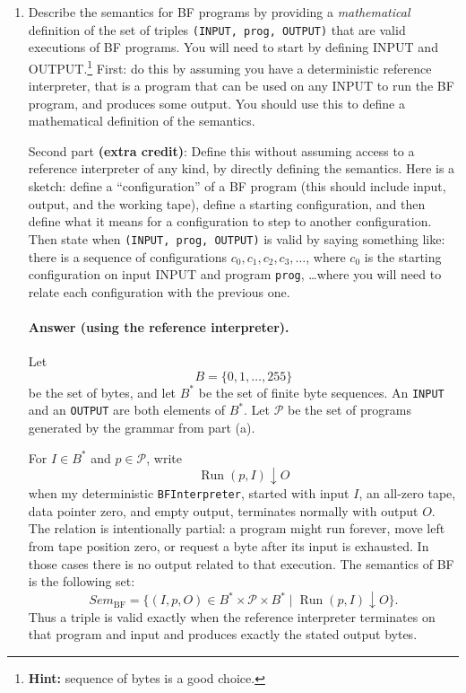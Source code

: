 \documentclass{article}
\begin{document}
\begin{enumerate}
\begin{enumerate}
\item
Describe the semantics for BF programs
by providing a \emph{mathematical} definition of the set of triples \texttt{(INPUT, prog, OUTPUT)} that are valid executions of BF programs.
You will need to start by defining INPUT and OUTPUT.\footnote{\textbf{Hint:} sequence of bytes is a good choice.}
First: do this by assuming you have a deterministic reference interpreter, that is a program that can be used on any INPUT to run the BF program, and produces some output.
You should use this to define a mathematical definition of the semantics.

Second part \textbf{(extra credit)}: Define this without assuming access to a reference interpreter of any kind,
by directly defining the semantics.
Here is a sketch: define a ``configuration'' of a BF program (this should include input, output, and the working tape), define a starting configuration, and then define what it means for a configuration to step to another configuration.
Then state when \texttt{(INPUT, prog, OUTPUT)} is valid by saying something like: there is a sequence of configurations $c_0, c_1, c_2, c_3, \ldots$, where $c_0$ is the starting configuration on input INPUT and program \texttt{prog}, \ldots where you will need to relate each configuration with the previous one.

\paragraph{Answer (using the reference interpreter).}
Let
\[
B = \{0,1,\ldots,255\}
\]
be the set of bytes, and let $B^*$ be the set of finite byte sequences.  An
\texttt{INPUT} and an \texttt{OUTPUT} are both elements of $B^*$.  Let
$\mathcal{P}$ be the set of programs generated by the grammar from part (a).

For $I \in B^*$ and $p \in \mathcal{P}$, write
\[
\operatorname{Run}(p,I) \mathrel{\downarrow} O
\]
when my deterministic \texttt{BFInterpreter}, started with input $I$, an
all-zero tape, data pointer zero, and empty output, terminates normally with
output $O$.  The relation is intentionally partial: a program might run
forever, move left from tape position zero, or request a byte after its input
is exhausted.  In those cases there is no output related to that execution.
The semantics of BF is the following set:
\[
\mathit{Sem}_{\mathrm{BF}}
=
\{(I,p,O) \in B^* \times \mathcal{P} \times B^*
  \mid \operatorname{Run}(p,I) \mathrel{\downarrow} O\}.
\]
Thus a triple is valid exactly when the reference interpreter terminates on
that program and input and produces exactly the stated output bytes.


\end{enumerate}
\end{enumerate}
\end{document}
